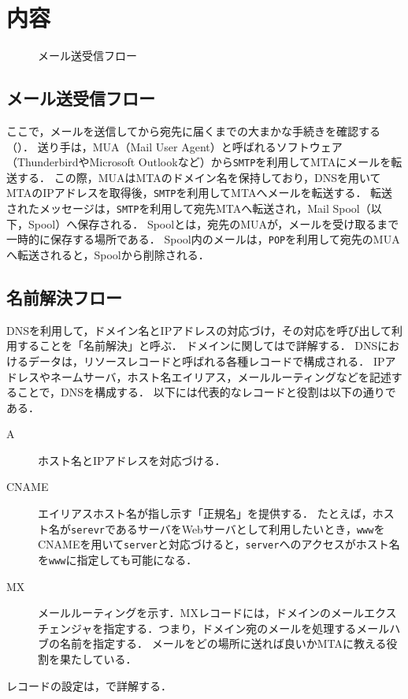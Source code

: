 \section{内容}
\begin{wrapfigure}{r}[0mm]{.48\textwidth}
    
    \caption{メール送受信フロー\footnotemark[1]}
    \label{fig:メール送受信フロー}
    \vspace{-1cm}
\end{wrapfigure}
\newcommand{\smtp}{\texttt{SMTP}}
\newcommand{\pop}{\texttt{POP}}
\newcommand{\imap}{\texttt{IMAP}}
\subsection{メール送受信フロー}
ここで，メールを送信してから宛先に届くまでの大まかな手続きを確認する（）．
送り手は，MUA（Mail User Agent）と呼ばれるソフトウェア（ThunderbirdやMicrosoft Outlookなど）から\smtp を利用してMTAにメールを転送する．
この際，MUAはMTAのドメイン名を保持しており，DNSを用いてMTAのIPアドレスを取得後，\smtp を利用してMTAへメールを転送する．
転送されたメッセージは，\smtp を利用して宛先MTAへ転送され，Mail Spool（以下，Spool）へ保存される．
Spoolとは，宛先のMUAが，メールを受け取るまで一時的に保存する場所である．
Spool内のメールは，\pop を利用して宛先のMUAへ転送されると，Spoolから削除される．
\subsection{名前解決フロー}
DNSを利用して，ドメイン名とIPアドレスの対応づけ，その対応を呼び出して利用することを「名前解決」と呼ぶ．
ドメインに関してはで詳解する．
DNSにおけるデータは，リソースレコードと呼ばれる各種レコードで構成される．
IPアドレスやネームサーバ，ホスト名エイリアス，メールルーティングなどを記述することで，DNSを構成する\cite[p.88]{Postfix実用ガイド}．
以下には代表的なレコードと役割は以下の通りである．
\begin{oframed}
    \begin{description}
        \item[A] ホスト名とIPアドレスを対応づける．
        \item[CNAME] エイリアスホスト名が指し示す「正規名」を提供する．
            たとえば，ホスト名が\texttt{serevr}であるサーバをWebサーバとして利用したいとき，\texttt{www}をCNAMEを用いて\texttt{server}と対応づけると，\texttt{server}へのアクセスがホスト名を\texttt{www}に指定しても可能になる．
        \item[MX] メールルーティングを示す．MXレコードには，ドメインのメールエクスチェンジャを指定する．つまり，ドメイン宛のメールを処理するメールハブの名前を指定する．
            メールをどの場所に送れば良いかMTAに教える役割を果たしている．
    \end{description}
    \hfill\cite[p.88\ -\ p.89]{Postfix実用ガイド}
\end{oframed}
レコードの設定は，で詳解する．
\newcommand{\alias}{\texttt{alias}}
\newcommand{\user}{ユーザ}
